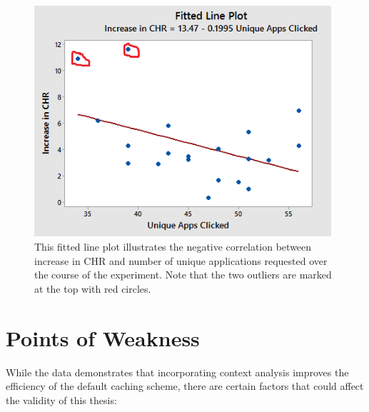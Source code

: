 \documentclass[12pt]{uthesis-v12}  %
\begin{document}
				\begin{figure}[h]
					\centering
					\includegraphics[width = 110mm]{images/uniqueAppsPlot.png}
					\caption[Increase in CHR vs Unique Applications Requested - Plot]{This fitted line plot illustrates the negative correlation between increase in CHR and number of unique applications requested over the course of the experiment. Note that the two outliers are marked at the top with red circles.}
				\end{figure}

\chapter{Points of Weakness}
	While the data demonstrates that incorporating context analysis improves the efficiency of the default caching scheme, there are certain factors that could affect the validity of this thesis:
	
\end{document}
